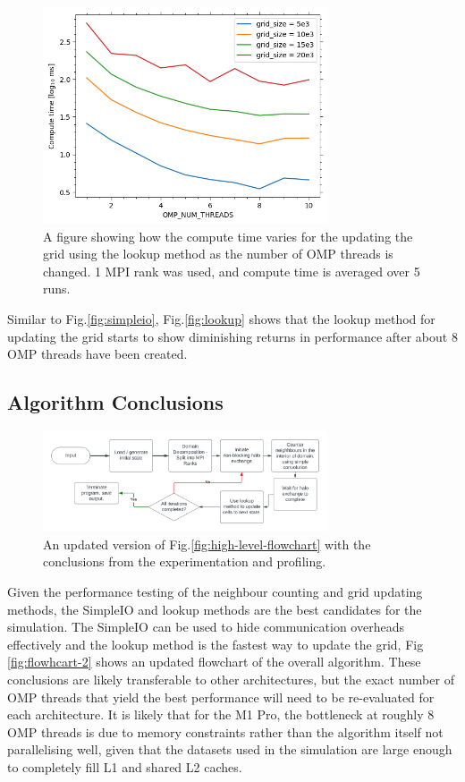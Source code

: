     \begin{figure}[htb]
    \centering
    \includegraphics[width=0.75\textwidth]{./figures/lookup}
    \caption{A figure showing how the compute time varies for the updating the grid using the lookup method as the number
        of OMP threads is changed.
        1 MPI rank was used, and compute time is averaged over 5 runs.}
    \label{fig:lookup}
    \end{figure}

    Similar to Fig.\eqref{fig:simpleio}, Fig.\eqref{fig:lookup} shows that the lookup method for updating the grid starts
    to show diminishing returns in performance after about 8 OMP threads have been created.

    \subsection{Algorithm Conclusions}\label{subsec:interim-conclusions}
\begin{figure}[htb]
    \centering
    \includegraphics[width=0.75\textwidth]{./figures/flowchat-2}
    \caption{An updated version of Fig.\eqref{fig:high-level-flowchart} with the conclusions from the experimentation
    and profiling.}
    \label{fig:flowhcart-2}
    \end{figure}
    Given the performance testing of the neighbour counting and grid updating methods, the SimpleIO and lookup methods
    are the best candidates for the simulation.
    The SimpleIO can be used to hide communication overheads effectively and the lookup method is the fastest way to
    update the grid, Fig \eqref{fig:flowhcart-2} shows an updated flowchart of the overall algorithm.
    These conclusions are likely transferable to other architectures, but the exact number of OMP threads that yield
    the best performance will need to be re-evaluated for each architecture.
    It is likely that for the M1 Pro, the bottleneck at roughly 8 OMP threads is due to memory constraints rather
    than the algorithm itself not parallelising well, given that the datasets used in the simulation are large enough
    to completely fill L1 and shared L2 caches.

